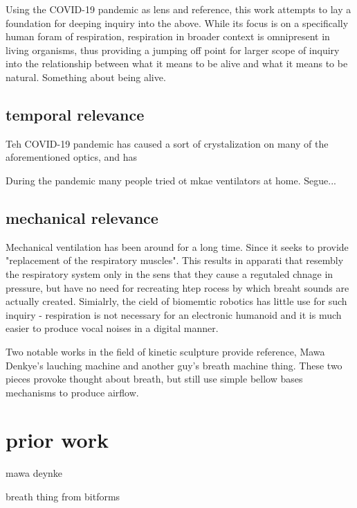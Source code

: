 \documentclass[letterpaper]{article}
\begin{document}
Using the COVID-19 pandemic as lens and reference, this work attempts to lay a foundation for deeping inquiry into the above. While its focus is on a specifically human foram of respiration, respiration in broader context is omnipresent in living organisms, thus providing a jumping off point for larger scope of inquiry into the relationship between what it means to be alive and what it means to be natural. Something about being alive. \cite{zimmer}


\subsection{temporal relevance}
Teh COVID-19 pandemic has caused a sort of crystalization on many of the aforementioned optics, and has  

During the pandemic many people tried ot mkae ventilators at home. Segue...

\subsection{mechanical relevance}
Mechanical ventilation has been around for a long time. Since it  seeks to provide "replacement of the respiratory muscles". \cite{ventilatorhistory} This results in apparati that resembly the respiratory system only in the sens that they cause a regutaled chnage in pressure, but have no need for recreating htep rocess by which breaht sounds are actually created. Simialrly, the cield of biomemtic robotics has little use for such inquiry - respiration is not necessary for an electronic humanoid and it is much easier to produce vocal noises in a digital manner. 

Two notable works in the field of kinetic sculpture provide reference, Mawa Denkye's lauching machine and another guy's breath machine thing. These two pieces provoke thought about breath, but still use simple bellow bases mechanisms to produce airflow. %

\section{prior work}

mawa deynke 

breath thing from bitforms
\end{document}
